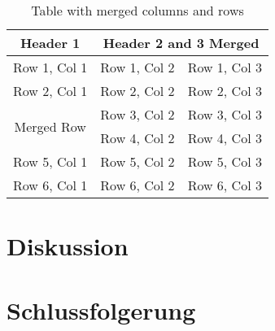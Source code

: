 \documentclass{article}
\begin{document}
    \begin{table}[H]
        \centering
        \begin{tabular}{|c|c|c|}
        \hline
        \textbf{Header 1} & \multicolumn{2}{|c|}{\textbf{Header 2 and 3 Merged}} \\ \hline
        Row 1, Col 1 & Row 1, Col 2 & Row 1, Col 3 \\ \hline
        Row 2, Col 1 & Row 2, Col 2 & Row 2, Col 3 \\ \hline
        \multirow{2}{*}{Merged Row} & Row 3, Col 2 & Row 3, Col 3 \\ \cline{2-3}
         & Row 4, Col 2 & Row 4, Col 3 \\ \hline
        Row 5, Col 1 & Row 5, Col 2 & Row 5, Col 3 \\ \hline
        Row 6, Col 1 & Row 6, Col 2 & Row 6, Col 3 \\ \hline
        \end{tabular}
        \caption{Table with merged columns and rows}
        \end{table}

\section{Diskussion}

\section{Schlussfolgerung}



\end{document}
